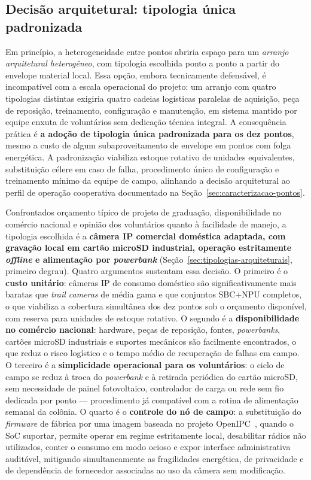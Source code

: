 \subsection*{Decisão arquitetural: tipologia única padronizada}

Em princípio, a heterogeneidade entre pontos abriria espaço para um \emph{arranjo arquitetural heterogêneo}, com tipologia escolhida ponto a ponto a partir do envelope material local. Essa opção, embora tecnicamente defensável, é incompatível com a escala operacional do projeto: um arranjo com quatro tipologias distintas exigiria quatro cadeias logísticas paralelas de aquisição, peça de reposição, treinamento, configuração e manutenção, em sistema mantido por equipe enxuta de voluntários sem dedicação técnica integral. A consequência prática é \textbf{a adoção de tipologia única padronizada para os dez pontos}, mesmo a custo de algum subaproveitamento de envelope em pontos com folga energética. A padronização viabiliza estoque rotativo de unidades equivalentes, substituição célere em caso de falha, procedimento único de configuração e treinamento mínimo da equipe de campo, alinhando a decisão arquitetural ao perfil de operação cooperativa documentado na Seção~\ref{sec:caracterizacao-pontos}.

Confrontados orçamento típico de projeto de graduação, disponibilidade no comércio nacional e opinião dos voluntários quanto à facilidade de manejo, a tipologia escolhida é a \textbf{câmera IP comercial doméstica adaptada, com gravação local em cartão microSD industrial, operação estritamente \emph{offline} e alimentação por \emph{powerbank}} (Seção~\ref{sec:tipologias-arquiteturais}, primeiro degrau). Quatro argumentos sustentam essa decisão. O primeiro é o \textbf{custo unitário}: câmeras IP de consumo doméstico são significativamente mais baratas que \emph{trail cameras} de média gama e que conjuntos SBC+NPU completos, o que viabiliza a cobertura simultânea dos dez pontos sob o orçamento disponível, com reserva para unidades de estoque rotativo. O segundo é a \textbf{disponibilidade no comércio nacional}: hardware, peças de reposição, fontes, \emph{powerbanks}, cartões microSD industriais e suportes mecânicos são facilmente encontrados, o que reduz o risco logístico e o tempo médio de recuperação de falhas em campo. O terceiro é a \textbf{simplicidade operacional para os voluntários}: o ciclo de campo se reduz à troca do \emph{powerbank} e à retirada periódica do cartão microSD, sem necessidade de painel fotovoltaico, controlador de carga ou rede sem fio dedicada por ponto --- procedimento já compatível com a rotina de alimentação semanal da colônia. O quarto é o \textbf{controle do nó de campo}: a substituição do \emph{firmware} de fábrica por uma imagem baseada no projeto OpenIPC~\cite{openipc2025}, quando o SoC suportar, permite operar em regime estritamente local, desabilitar rádios não utilizados, conter o consumo em modo ocioso e expor interface administrativa auditável, mitigando simultaneamente as fragilidades energética, de privacidade e de dependência de fornecedor associadas ao uso da câmera sem modificação.

